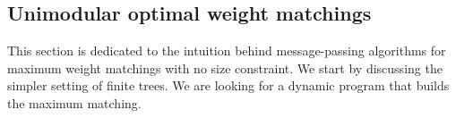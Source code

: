 \documentclass[11pt]{article}
\begin{document}
\subsection{Unimodular optimal weight matchings}
\label{subsec:premierpapier}
This section is dedicated to the intuition behind message-passing algorithms for maximum weight matchings with no size constraint.
We start by discussing the simpler setting of finite trees. We are looking for a dynamic program that builds the maximum matching. 


\begin{figure}[t!]
\centering
{} %

\begin{tikzpicture}[x=0.75pt,y=0.75pt,yscale=-1,xscale=1]


\end{tikzpicture}
\end{figure}
\end{document}
